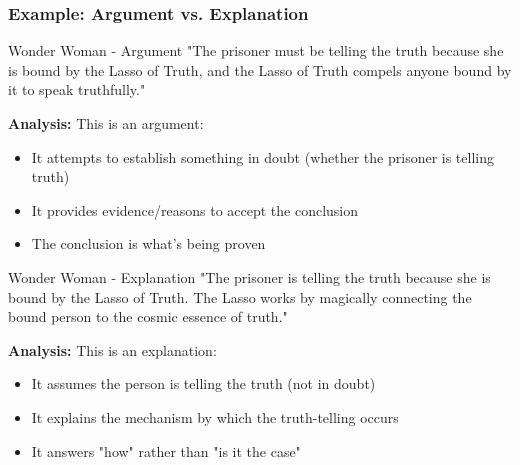 \documentclass{beamer}
\begin{document}
\begin{frame}
    \frametitle{Example: Argument vs. Explanation}
    
    \begin{exampleblock}{Wonder Woman - Argument}
    \scriptsize
        "The prisoner must be telling the truth because she is bound by the Lasso of Truth, and the Lasso of Truth compels anyone bound by it to speak truthfully."
        
        \textbf{Analysis:} This is an argument:
        \begin{itemize}
            \item It attempts to establish something in doubt (whether the prisoner is telling truth)
            \item It provides evidence/reasons to accept the conclusion
            \item The conclusion is what's being proven
        \end{itemize}
    \end{exampleblock}
    
    \begin{exampleblock}{Wonder Woman - Explanation}
    \scriptsize
        "The prisoner is telling the truth because she is bound by the Lasso of Truth. The Lasso works by magically connecting the bound person to the cosmic essence of truth."
        
        \textbf{Analysis:} This is an explanation:
        \begin{itemize}
            \item It assumes the person is telling the truth (not in doubt)
            \item It explains the mechanism by which the truth-telling occurs
            \item It answers "how" rather than "is it the case"
        \end{itemize}
    \end{exampleblock}
\end{frame}
\end{document}
